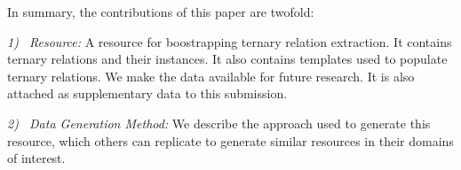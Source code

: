 In summary, the contributions of this paper are twofold:

\textit{1)~ Resource:}  A resource for boostrapping ternary relation extraction. It contains ternary relations and their instances. It also contains templates used to populate ternary relations. We make the data available for future research. It is also attached as supplementary data to this submission.

\textit{2)~ Data Generation Method:} We describe  the approach used to generate this resource, which others can replicate to generate similar resources in their  domains of interest.

 
%



%
%
%
%
%


